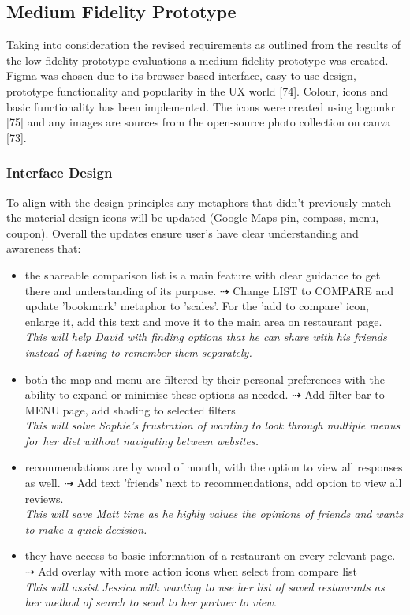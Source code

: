 \documentclass[a4 paper, 12pt]{article}
\begin{document}
\subsection{Medium Fidelity Prototype}
Taking into consideration the revised requirements as outlined from the results of the low fidelity prototype evaluations a medium fidelity prototype was created. Figma was chosen due to its browser-based interface, easy-to-use design, prototype functionality and popularity in the UX world [74]. Colour, icons and basic functionality has been implemented. The icons were created using logomkr [75] and any images are sources from the open-source photo collection on canva [73].

    \subsubsection{Interface Design}
    To align with the design principles any metaphors that didn't previously match the material design icons will be updated (Google Maps pin, compass, menu, coupon). Overall the updates ensure user's have clear understanding and awareness that:
        \begin{itemize}
            \item the shareable comparison list is a main feature with clear guidance to get there and understanding of its purpose. $\dashrightarrow$ Change LIST to COMPARE and update 'bookmark' metaphor to 'scales'. For the 'add to compare' icon, enlarge it, add this text and move it to the main area on restaurant page.
            \\ \textit{This will help David with finding options that he can share with his friends instead of having to remember them separately.} 
            \item both the map and menu are filtered by their personal preferences with the ability to expand or minimise these options as needed. $\dashrightarrow$ Add filter bar to MENU page, add shading to selected filters \\ 
            \textit{This will solve Sophie's frustration of wanting to look through multiple menus for her diet without navigating between websites.}
            \item recommendations are by word of mouth, with the option to view all responses as well. $\dashrightarrow$ Add text 'friends' next to recommendations, add option to view all reviews. \\
            \textit{This will save Matt time as he highly values the opinions of friends and wants to make a quick decision.}
            \item they have access to basic information of a restaurant on every relevant page. $\dashrightarrow$ Add overlay with more action icons when select from compare list \\
            \textit{This will assist Jessica with wanting to use her list of saved restaurants as her method of search to send to her partner to view.}
        \end{itemize}        
        
\end{document}
